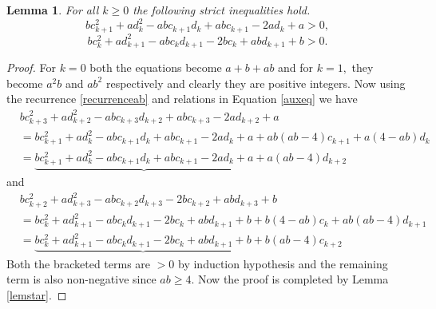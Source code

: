 \documentclass[12pt,reqno]{amsart}
\theoremstyle{plain}
\newtheorem{lem}{Lemma}
\theoremstyle{definition}
\theoremstyle{remark}
\begin{document}
\begin{lem}\label{lem2}
    For all $k\geq 0$ the following strict inequalities hold.
    \begin{equation}\label{funnyeq00}
        bc_{k+1}^2+ad_{k}^2-abc_{k+1}d_{k}+abc_{k+1}-2ad_{k}+a> 0,
    \end{equation}
    \begin{equation}\label{funnyeq01}
        bc_k^2+ad_{k+1}^2-abc_kd_{k+1}-2bc_k+abd_{k+1}+b> 0.
    \end{equation}
\end{lem}
\begin{proof}
    For $k=0$ both the equations become $a+b+ab$ and  for $k=1,$ they become $a^2b$ and $ab^2$ respectively and clearly they are positive integers. Now using the recurrence \ref{recurrenceab} and relations in Equation \ref{auxeq} we have 
    \begin{align*}
        & bc_{k+3}^2+ad_{k+2}^2-abc_{k+3}d_{k+2}+abc_{k+3}-2ad_{k+2}+a\\
        &=bc_{k+1}^2+ad_{k}^2-abc_{k+1}d_{k}+abc_{k+1}-2ad_{k}+a+ab(ab-4)c_{k+1}+a(4-ab)d_{k}\\
        &=\underbrace{bc_{k+1}^2+ad_{k}^2-abc_{k+1}d_{k}+abc_{k+1}-2ad_{k}+a}+a(ab-4)d_{k+2}
    \end{align*}
     and 
     \begin{align*}
        &bc_{k+2}^2+ad_{k+3}^2-abc_{k+2}d_{k+3}-2bc_{k+2}+abd_{k+3}+b\\
        &=bc_k^2+ad_{k+1}^2-abc_kd_{k+1}-2bc_k+abd_{k+1}+b+b(4-ab)c_{k}+ab(ab-4)d_{k+1}\\
        &=\underbrace{bc_k^2+ad_{k+1}^2-abc_kd_{k+1}-2bc_k+abd_{k+1}+b}+b(ab-4)c_{k+2}
    \end{align*}
    Both the bracketed terms are $>0$ by induction hypothesis and the remaining term is also non-negative since $ab\geq 4.$ Now the proof is completed by Lemma \ref{lemstar}.
\end{proof}
\end{document}
